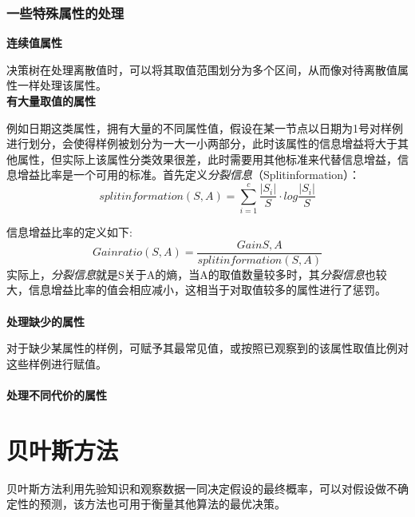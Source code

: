\documentclass[a4papper]{article}
\begin{document}
\subsubsection{一些特殊属性的处理}
\indent
\textbf{连续值属性}
\par\setlength{\parindent}{2em} %
决策树在处理离散值时，可以将其取值范围划分为多个区间，从而像对待离散值属性一样处理该属性。\\
\indent\textbf{有大量取值的属性}
\par\setlength{\parindent}{2em} %
例如日期这类属性，拥有大量的不同属性值，假设在某一节点以日期为1号对样例进行划分，会使得样例被划分为一大一小两部分，此时该属性的信息增益将大于其他属性，但实际上该属性分类效果很差，此时需要用其他标准来代替信息增益，信息增益比率是一个可用的标准。首先定义\emph{分裂信息}（Splitinformation）：
\begin{equation*}
  splitinformation(S,A) = \sum_{i=1}^{c}\frac{|S_i|}{S}\cdot log \frac{|S_i|}{S}
\end{equation*}
\par\setlength{\parindent}{2em} %
信息增益比率的定义如下:
\begin{equation*}
  Gainratio(S,A) = \frac{Gain{S,A}}{splitinformation(S,A)}
\end{equation*}
实际上，\emph{分裂信息}就是S关于A的熵，当A的取值数量较多时，其\emph{分裂信息}也较大，信息增益比率的值会相应减小，这相当于对取值较多的属性进行了惩罚。\\\\
\textbf{处理缺少的属性}
\par\setlength{\parindent}{2em} %
对于缺少某属性的样例，可赋予其最常见值，或按照已观察到的该属性取值比例对这些样例进行赋值。\\\\
\textbf{处理不同代价的属性}
\section{贝叶斯方法}
\par\setlength{\parindent}{2em} %
贝叶斯方法利用先验知识和观察数据一同决定假设的最终概率，可以对假设做不确定性的预测，该方法也可用于衡量其他算法的最优决策。
\end{document}

